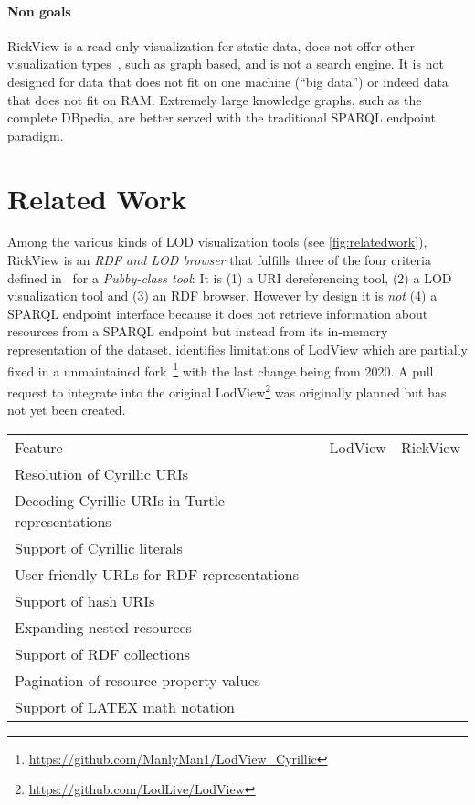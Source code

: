 \documentclass{ceurart}
\begin{document}
\paragraph{Non goals}
RickView is a read-only visualization for static data, does not offer other visualization types~\citep{linkeddatavisualization}, such as graph based, and is not a search engine.
It is not designed for data that does not fit on one machine (\enquote{big data}) or indeed data that does not fit on RAM.
Extremely large knowledge graphs, such as the complete DBpedia, are better served with the traditional SPARQL endpoint paradigm.

\section{Related Work}\label{relatedwork}
Among the various kinds of LOD visualization tools (see \cref{fig:relatedwork}), RickView is an \emph{RDF and LOD browser} that fulfills three of the four criteria defined in~\cite{adaptinglodview} for a \emph{Pubby-class tool}:
It is (1) a URI dereferencing tool, (2) a LOD visualization tool and (3) an RDF browser.
However by design it is \emph{not} (4) a SPARQL endpoint interface because it does not retrieve information about resources from a SPARQL endpoint but instead from its in-memory representation of the dataset.
\citep{adaptinglodview} identifies limitations of LodView which are partially fixed in a unmaintained fork~\footnote{\url{https://github.com/ManlyMan1/LodView_Cyrillic}} with the last change being from 2020.
A pull request to integrate into the original LodView\footnote{\url{https://github.com/LodLive/LodView}} was originally planned but has not yet been created.

\begin{tabular}{lll}
\toprule
Feature												&LodView	&RickView\\
Resolution of Cyrillic URIs							&\\
Decoding Cyrillic URIs in Turtle representations	&\\
Support of Cyrillic literals						&\\
User-friendly URLs for RDF representations			&&\\
Support of hash URIs			&&\\
Expanding nested resources			&&\\
Support of RDF collections			&&\\
Pagination of resource property values			&&\\
Support of LATEX math notation			&&\\
\midrule
\bottomrule
\end{tabular}
\end{document}
